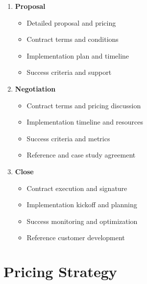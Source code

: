 \documentclass[business]{../templates/infraradar-main}
\begin{document}
\begin{enumerate}
    \item \textbf{Proposal}
    \begin{itemize}
        \item Detailed proposal and pricing
        \item Contract terms and conditions
        \item Implementation plan and timeline
        \item Success criteria and support
    \end{itemize}
    
    \item \textbf{Negotiation}
    \begin{itemize}
        \item Contract terms and pricing discussion
        \item Implementation timeline and resources
        \item Success criteria and metrics
        \item Reference and case study agreement
    \end{itemize}
    
    \item \textbf{Close}
    \begin{itemize}
        \item Contract execution and signature
        \item Implementation kickoff and planning
        \item Success monitoring and optimization
        \item Reference customer development
    \end{itemize}
\end{enumerate}

\section{Pricing Strategy}
\end{document}
